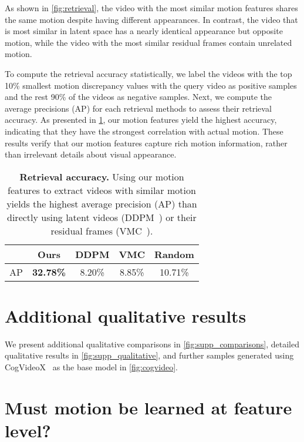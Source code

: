 As shown in \cref{fig:retrieval}, the video with the most similar motion features shares the same motion despite having different appearances. In contrast, the video that is most similar in latent space has a nearly identical appearance but opposite motion, while the video with the most similar residual frames contain unrelated motion.

To compute the retrieval accuracy statistically, we label the videos with the top 10\% smallest motion discrepancy values with the query video as positive samples and the rest 90\% of the videos as negative samples. Next, we compute the average precisions (AP) for each retrieval methods to assess their retrieval accuracy. As presented in \cref{tab:retrieval_quant}, our motion features yield the highest accuracy, indicating that they have the strongest correlation with actual motion. These results verify that our motion features capture rich motion information, rather than irrelevant details about visual appearance.

\begin{table}[h]
  \centering
\begin{tabular}{ccccc}
  \toprule
  &\textbf{Ours} & DDPM & VMC & Random \\ \midrule
  AP & \textbf{32.78\%} & 8.20\% & 8.85\% &10.71\% \\
  \bottomrule
\end{tabular}

  \caption{{\bf Retrieval accuracy.} Using our motion features to extract videos with similar motion yields the highest average precision (AP) than directly using latent videos (DDPM~\cite{ddpm}) or their residual frames (VMC~\cite{vmc}).}
  \label{tab:retrieval_quant}
\end{table}



\section{Additional qualitative results}
\label{sec:supp_qualitative}

We present additional qualitative comparisons in \cref{fig:supp_comparisons}, detailed qualitative results in \cref{fig:supp_qualitative}, and further samples generated using CogVideoX~\cite{cogvideo} as the base model in \cref{fig:cogvideo}.

\section{Must motion be learned at feature level?}
\label{sec:why}

